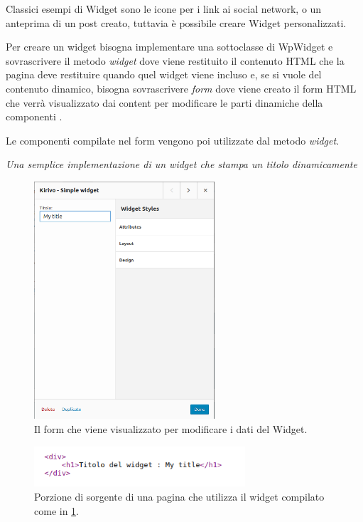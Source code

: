 Classici esempi di Widget sono le icone per i link ai social network, o un anteprima di un post creato, tuttavia è possibile creare Widget
personalizzati.

Per creare un widget bisogna implementare una sottoclasse di WpWidget\cite{WPWID}
e sovrascrivere il metodo \emph{widget} dove viene restituito il contenuto HTML che la pagina deve restituire quando quel widget viene incluso
e, se si vuole del contenuto dinamico, bisogna sovrascrivere \emph{form} dove viene creato il form HTML che verrà visualizzato dai content per modificare le
parti dinamiche della componenti	.

Le componenti compilate nel form vengono poi utilizzate dal metodo \emph{widget}.



\emph{Una semplice implementazione di un widget che stampa un titolo dinamicamente}


\begin{figure}
  \includegraphics[width=0.6\textwidth]{figure/wid_form.png}
  \caption{Il form che viene visualizzato per modificare i dati del Widget.}
  \label{fig:wform}
\end{figure}
\begin{figure}
  \includegraphics[width=0.7\textwidth]{figure/sourcewid.png}
  \caption{Porzione di sorgente di una pagina che utilizza il widget compilato come in \ref{fig:wform}.}
  \label{fig:wsource}
\end{figure}

